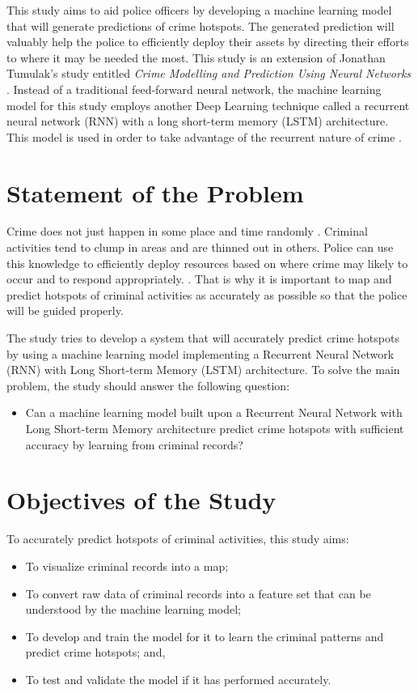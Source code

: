     This study aims to aid police officers by developing a machine learning model that will generate predictions of crime hotspots. The generated prediction will valuably help the police to efficiently deploy their assets by directing their efforts to where it may be needed the most. This study is an extension of Jonathan Tumulak's study entitled \textit{Crime Modelling and Prediction Using Neural Networks} \citeyearpar{tumulak2015crime}. Instead of a traditional feed-forward neural network, the machine learning model for this study employs another Deep Learning technique called a recurrent neural network (RNN) with a long short-term memory (LSTM) architecture. This model is used in order to take advantage of the recurrent nature of crime \citep{perc2013understanding}.

\section{Statement of the Problem}

    Crime does not just happen in some place and time randomly \citep{brantingham2005modeling}. Criminal activities tend to clump in areas and are thinned out in others. Police can use this knowledge to efficiently deploy resources based on where crime may likely to occur and to respond appropriately. \citep{eck2005mapping}. That is why it is important to map and predict hotspots of criminal activities as accurately as possible so that the police will be guided properly.

    The study tries to develop a system that will accurately predict crime hotspots by using a machine learning model implementing a Recurrent Neural Network (RNN) with Long Short-term Memory (LSTM) architecture. To solve the main problem, the study should answer the following question:
        \begin{itemize}
        \item Can a machine learning model built upon a Recurrent Neural Network with Long Short-term Memory architecture predict crime hotspots with sufficient accuracy by learning from criminal records?
        \end{itemize}

\section{Objectives of the Study}

To accurately predict hotspots of criminal activities, this study aims:
        \begin{itemize}
        \item To visualize criminal records into a map;
        \item To convert raw data of criminal records into a feature set that can be understood by the machine learning model;
        \item To develop and train the model for it to learn the criminal patterns and predict crime hotspots; and,
        \item To test and validate the model if it has performed accurately.
        \end{itemize}

